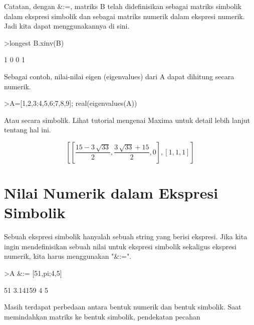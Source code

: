 \documentclass{article}
\newenvironment{eulernotebook}{\par}{\par}
\newcommand{\eulerheading}[1]{\section{#1}}
\newenvironment{eulercomment}{\par\medskip}{\par\medskip}
\newenvironment{eulerformula}{}{}
\begin{document}
\begin{eulernotebook}
\begin{eulercomment}
\begin{eulercomment}
\begin{eulercomment}
\begin{eulercomment}
\begin{eulercomment}
\begin{eulercomment}
\begin{eulercomment}
Catatan, dengan \&:=, matriks B telah didefinisikan sebagai matriks
simbolik dalam ekspresi simbolik dan sebagai matriks numerik dalam
ekspresi numerik. Jadi kita dapat menggunakannya di sini.
\end{eulercomment}
\begin{eulerprompt}
>longest B.xinv(B)
\end{eulerprompt}
\begin{euleroutput}
                        1                       0 
                        0                       1 
\end{euleroutput}
\begin{eulercomment}
Sebagai contoh, nilai-nilai eigen (eigenvalues) dari A dapat dihitung
secara numerik.
\end{eulercomment}
\begin{eulerprompt}
>A=[1,2,3;4,5,6;7,8,9]; real(eigenvalues(A))
\end{eulerprompt}
\begin{euleroutput}
  [16.1168,  -1.11684,  0]
\end{euleroutput}
\begin{eulercomment}
Atau secara simbolik. Lihat tutorial mengenai Maxima untuk detail
lebih lanjut tentang hal ini.
\end{eulercomment}
\begin{eulerformula}
\[
\left[ \left[ \frac{15-3\,\sqrt{33}}{2} , \frac{3\,\sqrt{33}+15}{2}   , 0 \right]  , \left[ 1 , 1 , 1 \right]  \right] 
\]
\end{eulerformula}
\eulerheading{Nilai Numerik dalam Ekspresi Simbolik}
\begin{eulercomment}
Sebuah ekspresi simbolik hanyalah sebuah string yang berisi ekspresi.
Jika kita ingin mendefinisikan sebuah nilai untuk ekspresi simbolik
sekaligus ekspresi numerik, kita harus menggunakan "\&:=".
\end{eulercomment}
\begin{eulerprompt}
>A &:= [51,pi;4,5]
\end{eulerprompt}
\begin{euleroutput}
             51       3.14159 
              4             5 
\end{euleroutput}
\begin{eulercomment}
Masih terdapat perbedaan antara bentuk numerik dan bentuk simbolik.
Saat memindahkan matriks ke bentuk simbolik, pendekatan pecahan

\end{eulercomment}
\end{eulercomment}
\end{eulercomment}
\end{eulercomment}
\end{eulercomment}
\end{eulercomment}
\end{eulercomment}
\end{eulernotebook}
\end{document}
